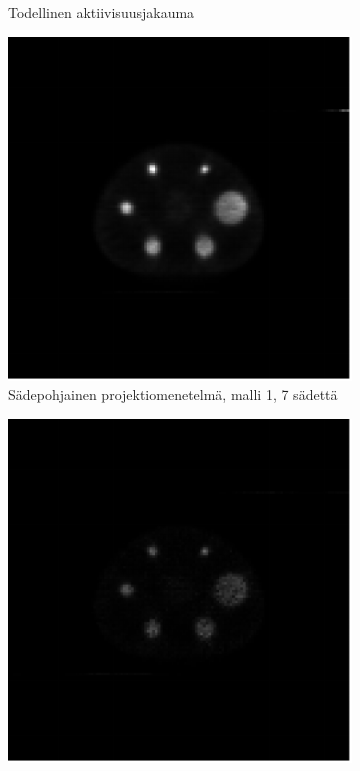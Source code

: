 \begin{figure}[H]
\begin{subfigure}[t]{.25\textwidth}
        \caption{Todellinen aktiivisuusjakauma}
    \end{subfigure}%
    \hspace{.075\textwidth}%
    \begin{subfigure}[t]{.25\textwidth}
        \includegraphics[width=\linewidth]{kuvat/nema_rekonstruktio_proj1_malli1_nRay7.pdf}
        \caption{Sädepohjainen projektiomenetelmä, malli 1, 7 sädettä}
    \end{subfigure}
    \begin{subfigure}[b]{.25\textwidth}
        \includegraphics[width=\linewidth]{kuvat/nema_rekonstruktio_proj1_malli2_nRay7.pdf}

\end{subfigure}
\end{figure}
